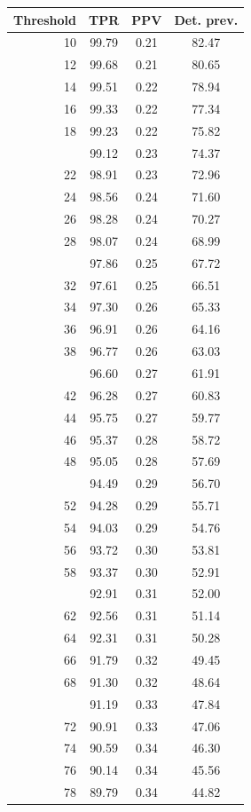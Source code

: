 \documentclass[12pt]{article}
\begin{document}
\begin{minipage}{0.5\textwidth}\small
\begin{tabular}{rccc}
\toprule
\textbf{Threshold} & \textbf{TPR} 
& \textbf{PPV} & \textbf{Det. prev.} \\
\midrule
   10 & 99.79 & 0.21 & 82.47 \\ 
     12 & 99.68 & 0.21 & 80.65 \\ 
     14 & 99.51 & 0.22 & 78.94 \\ 
     16 & 99.33 & 0.22 & 77.34 \\ 
     18 & 99.23 & 0.22 & 75.82 \\  \addlinespace
     20 & 99.12 & 0.23 & 74.37 \\ 
     22 & 98.91 & 0.23 & 72.96 \\ 
     24 & 98.56 & 0.24 & 71.60 \\ 
     26 & 98.28 & 0.24 & 70.27 \\ 
     28 & 98.07 & 0.24 & 68.99 \\ \addlinespace
     30 & 97.86 & 0.25 & 67.72 \\ 
     32 & 97.61 & 0.25 & 66.51 \\ 
     34 & 97.30 & 0.26 & 65.33 \\ 
     36 & 96.91 & 0.26 & 64.16 \\ 
     38 & 96.77 & 0.26 & 63.03 \\ \addlinespace
     40 & 96.60 & 0.27 & 61.91 \\ 
     42 & 96.28 & 0.27 & 60.83 \\ 
     44 & 95.75 & 0.27 & 59.77 \\ 
     46 & 95.37 & 0.28 & 58.72 \\ 
     48 & 95.05 & 0.28 & 57.69 \\ \addlinespace
     50 & 94.49 & 0.29 & 56.70 \\ 
     52 & 94.28 & 0.29 & 55.71 \\ 
     54 & 94.03 & 0.29 & 54.76 \\ 
     56 & 93.72 & 0.30 & 53.81 \\ 
     58 & 93.37 & 0.30 & 52.91 \\ \addlinespace
     60 & 92.91 & 0.31 & 52.00 \\ 
     62 & 92.56 & 0.31 & 51.14 \\ 
     64 & 92.31 & 0.31 & 50.28 \\ 
     66 & 91.79 & 0.32 & 49.45 \\ 
     68 & 91.30 & 0.32 & 48.64 \\ \addlinespace
     70 & 91.19 & 0.33 & 47.84 \\ 
     72 & 90.91 & 0.33 & 47.06 \\ 
     74 & 90.59 & 0.34 & 46.30 \\ 
     76 & 90.14 & 0.34 & 45.56 \\ 
     78 & 89.79 & 0.34 & 44.82 \\ 
     
\bottomrule
\end{tabular}

\end{minipage} \hfill
\end{document}
